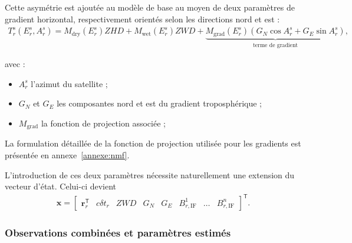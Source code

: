 Cette asymétrie est ajoutée au modèle de base au moyen de deux paramètres de
gradient horizontal, respectivement orientés selon les directions nord et
est :
\begin{align}
T_r^s(E_r^s,A_r^s)
=
M_{\mathrm{dry}}(E_r^s)ZHD
+
M_{\mathrm{wet}}(E_r^s)ZWD
+
\underbrace{
M_{\mathrm{grad}}(E_r^s)
\left(
G_N\cos A_r^s + G_E\sin A_r^s
\right)
}_{\text{terme de gradient}},
\label{eq:tropo_grad}
\end{align}

avec :

\begin{itemize}
    \item $A_r^s$ l'azimut du satellite ;
    \item $G_N$ et $G_E$ les composantes nord et est du gradient
    troposphérique ;
    \item $M_{\mathrm{grad}}$ la fonction de projection associée ;
\end{itemize}

La formulation détaillée de la fonction de projection utilisée pour les gradients est
présentée en annexe~\ref{annexe:nmf}.

L'introduction de ces deux paramètres nécessite naturellement une extension
du vecteur d'état. Celui-ci devient
\begin{align}
\mathbf x
=
\begin{bmatrix}
\mathbf r_r^{\mathsf T} & c\delta t_r & ZWD & G_N & G_E &
B_{r,\mathrm{IF}}^1 & \ldots & B_{r,\mathrm{IF}}^n
\end{bmatrix}^{\mathsf T}.
\label{eq:state_zwd_grad}
\end{align}


\subsubsection{Observations combinées et paramètres estimés}

